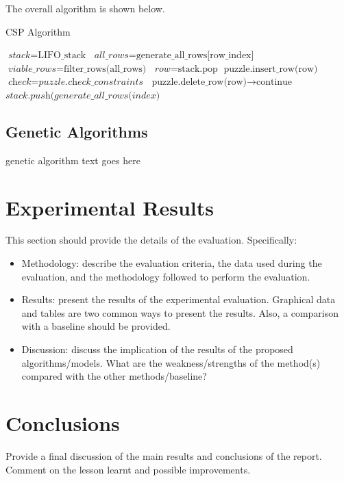 \documentclass{svproc}
\begin{document}
The overall algorithm is shown below.

\begin{algorithm}
    \caption{CSP Algorithm}\label{euclid}
    \begin{algorithmic}[1]
        \State $\textit{stack} = \text{LIFO\_stack}$
        \State $\textit{all\_rows} = \text{generate\_all\_rows[row\_index]}$
        \State $\textit{viable\_rows} = \text{filter\_rows(all\_rows)}$
        \State $\textit{row} = \text{stack.pop}$
        \State $\text{puzzle.insert\_row(row)}$
        \State $\textit{check} = \textit{puzzle.check\_constraints}$
        \State $\text{puzzle.delete\_row(row)} \to \text{continue}$
        \EndIf
        \State $\textit{stack.push(generate\_all\_rows(index)}$
        \EndWhile
        \EndWhile
    \end{algorithmic}
\end{algorithm}

\subsection{Genetic Algorithms}
genetic algorithm text goes here

\section{Experimental Results}
	This section should provide the details of the evaluation. Specifically:
\begin{itemize}
	\item Methodology: describe the evaluation criteria, the data used during the evaluation, and the methodology followed to perform the evaluation.
	\item Results: present the results of the experimental evaluation. Graphical data and tables are two common ways to present the results. Also, a comparison with a baseline should be provided.
	\item Discussion: discuss the implication of the results of the proposed algorithms/models. What are the weakness/strengths of the method(s) compared with the other methods/baseline?
\end{itemize}


\section{Conclusions}
Provide a final discussion of the main results and conclusions of the report. Comment on the lesson learnt and possible improvements.
\end{document}

